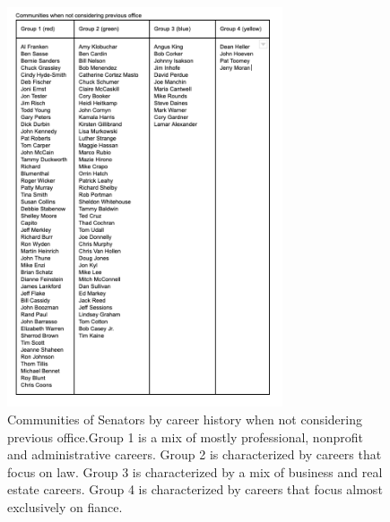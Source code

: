 \documentclass[11pt,twocolumn]{article}
\begin{document}
\begin{figure}[H]
    \centering
    \includegraphics[width=3.2in]{comm_no_office}
    \caption{{Communities of Senators by career history when not considering previous office.\newline Group 1 is a mix of mostly professional, nonprofit and administrative careers. \newline Group 2 is characterized by careers that focus on law. \newline Group 3 is characterized by a mix of business and real estate careers. \newline Group 4 is characterized by careers that focus almost exclusively on fiance.}}
    \label{fig:ds}
\end{figure}
\end{document}
